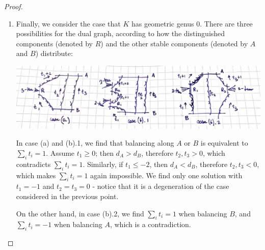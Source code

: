 \documentclass[11pt]{amsart}
\newcommand{\PP}{\mathbb P}
\theoremstyle{plain}
\theoremstyle{definition}
\begin{document}
\begin{proof}
\begin{enumerate}[leftmargin=.6cm]
 \item Finally, we consider the case that $K$ has geometric genus $0$. There are three possibilities for the dual graph, according to how the distinguished components (denoted by $R$) and the other stable components (denoted by $A$ and $B$) distribute:
  
  \begin{center}
 \includegraphics[width=.8\textwidth]{rational_pretzel}  
  \end{center}
 In case (a) and (b).1, we find that balancing along $A$ or $B$ is equivalent to $\sum_it_i=1$. Assume $t_1\geq0$; then $d_A>d_B$, therefore $t_2,t_3>0$, which contradicts $\sum_it_i=1$. Similarly, if $t_1\leq -2$, then $d_A<d_B$, therefore $t_2,t_3<0$, which makes $\sum_it_i=1$ again impossible. We find only one solution with $t_1=-1$ and $t_2=t_3=0$ - notice that it is a degeneration of the case considered in the previous point.
 
 On the other hand, in case (b).2, we find $\sum_it_i=1$ when balancing $B$, and $\sum_it_i=-1$ when balancing $A$, which is a contradiction.

\end{enumerate}
\end{proof}
\end{document}
